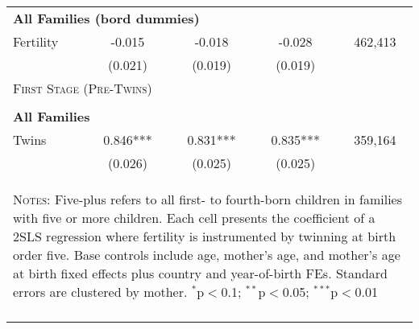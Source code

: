 \begin{table}[!htbp]
\begin{tabular}{lcccc}
\multicolumn{5}{l}{\textbf{All Families (bord dummies)}}\\ 
Fertility&-0.015&-0.018&-0.028&462,413\\
         &(0.021)&(0.019)&(0.019)&\\
\midrule\multicolumn{5}{l}{\textsc{First Stage (Pre-Twins)}}\\ 
&&&&\\
\multicolumn{5}{l}{\textbf{All Families}}\\ 
Twins&0.846***&0.831***&0.835***&359,164\\
         &(0.026)&(0.025)&(0.025)&\\
\hline\multicolumn{5}{p{10cm}}{\begin{footnotesize}\textsc{Notes:} Five-plus refers to all first- to fourth-born children in families with five or more children.  Each cell presents the coefficient of a 2SLS regression where fertility is instrumented by twinning at birth order five.  Base controls include age, mother's age, and mother's age at birth fixed effects plus country and year-of-birth FEs.  Standard errors are clustered by mother. 
$^{*}$p$<$0.1; $^{**}$p$<$0.05; $^{***}$p$<$0.01\end{footnotesize}}
\\\bottomrule\normalsize\end{tabular}\end{table} 
